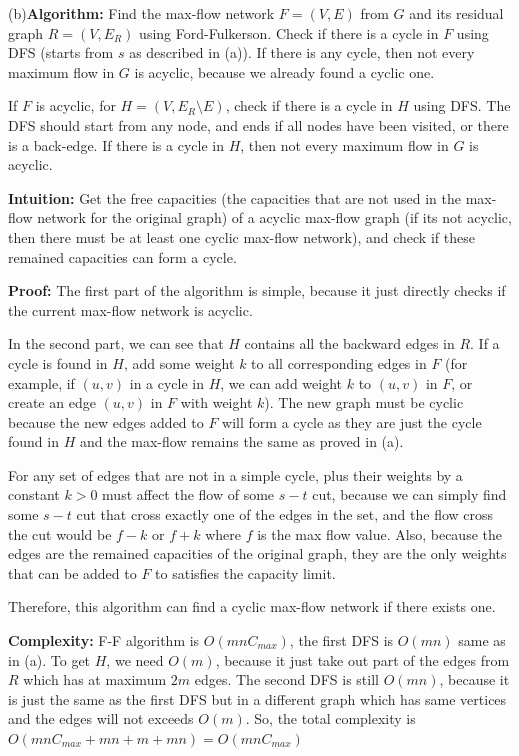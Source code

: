 \documentclass{article}
\newcommand{\algorithm}{\textbf{Algorithm:} }
\newcommand{\proof}{\textbf{Proof:} }
\newcommand{\intuition}{\textbf{Intuition:} }
\newcommand{\complexity}{\textbf{Complexity:} }
\begin{document}
\begin{enumerate}[topsep=0pt]
(b)\algorithm
Find the max-flow network $F=(V,E)$ from $G$ and its residual graph $R=(V,E_R)$ using Ford-Fulkerson.
Check if there is a cycle in $F$ using DFS (starts from $s$ as described in (a)). If there is any cycle,
then not every maximum flow in $G$ is acyclic, because we already found a cyclic one.

If $F$ is acyclic, for $H=(V,E_R\setminus E)$, check if there is a cycle in $H$ using DFS.
The DFS should start from any node, and ends if all nodes have been visited, or there is a back-edge.
If there is a cycle in $H$, then not every maximum flow in $G$ is acyclic.

\intuition
Get the free capacities (the capacities that are not used in the max-flow network for the original graph) of a acyclic max-flow graph 
(if its not acyclic, then there must be at least one cyclic max-flow network),
and check if these remained capacities can form a cycle.

\proof
The first part of the algorithm is simple, because it just directly checks if the current max-flow network is acyclic.

In the second part, we can see that $H$ contains all the backward edges in $R$. If a cycle is found in $H$,
add some weight $k$ to all corresponding edges in $F$ 
(for example, if $(u,v)$ in a cycle in $H$, we can add weight $k$ to $(u,v)$ in $F$, or create an edge $(u,v)$ in $F$ with weight $k$).
The new graph must be cyclic because the new edges added to $F$ will form a cycle as they are just the cycle found in $H$ 
and the max-flow remains the same as proved in (a).

For any set of edges that are not in a simple cycle, plus their weights by a constant $k>0$ must affect the flow of some $s-t$ cut,
because we can simply find some $s-t$ cut that cross exactly one of the edges in the set, 
and the flow cross the cut would be $f-k$ or $f+k$ where $f$ is the max flow value. 
Also, because the edges are the remained capacities of the original graph, 
they are the only weights that can be added to $F$ to satisfies the capacity limit.

Therefore, this algorithm can find a cyclic max-flow network if there exists one.

\complexity
F-F algorithm is $O(mnC_{max})$, the first DFS is $O(mn)$ same as in (a). 
To get $H$, we need $O(m)$, because it just take out part of the edges from $R$ which has at maximum $2m$ edges.
The second DFS is still $O(mn)$, because it is just the same as the first DFS but in a different graph which has same vertices 
and the edges will not exceeds $O(m)$.
So, the total complexity is $O(mnC_{max}+mn+m+mn)=O(mnC_{max})$


\end{enumerate}
\end{document}
